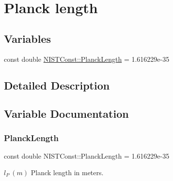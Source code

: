 \hypertarget{group___planck_length}{}\section{Planck length}
\label{group___planck_length}
\subsection*{Variables}
\begin{DoxyCompactItemize}
\item 
const double \hyperlink{group___planck_length_ga1bc5c33e67f9810e7505b30076df5ca3}{N\+I\+S\+T\+Const\+::\+Planck\+Length} = 1.\+616229e-\/35
\end{DoxyCompactItemize}


\subsection{Detailed Description}


\subsection{Variable Documentation}
\mbox{\label{group___planck_length_ga1bc5c33e67f9810e7505b30076df5ca3}} 
\subsubsection{\texorpdfstring{Planck\+Length}{PlanckLength}}
{\footnotesize\ttfamily const double N\+I\+S\+T\+Const\+::\+Planck\+Length = 1.\+616229e-\/35}

$l_P \ (m)$ Planck length in meters. 
